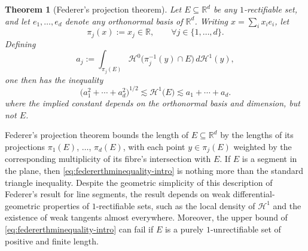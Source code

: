 \documentclass[12pt]{amsart}
\newtheorem{theorem}{Theorem}[section]
\theoremstyle{definition}
\numberwithin{equation}{section}
\begin{document}
\begin{theorem}[Federer's projection theorem]\label{thm:federerprojection-intro}
Let $E \subseteq \mathbb{R}^d$ be any $1$-rectifiable set, and let $e_1,\ldots,e_d$ denote any orthonormal basis of $\mathbb{R}^d$. Writing $x = \sum_i x_i e_i$, let
$$
\pi_j(x) := x_j \in \mathbb{R}, \qquad \forall j \in \{1,\ldots,d\}.
$$
Defining
$$
a_j := \int_{\pi_j(E)} \mathcal{H}^0\big(\pi_j^{-1}(y) \cap E\big)\,d\mathcal{H}^1(y),
$$
one then has the inequality
\begin{equation}\label{eq:federerthminequality-intro}
\big(a_1^2 + \cdots + a_d^2 \big)^{1/2} \lesssim \mathcal{H}^1\big(E \big) \lesssim a_1 + \cdots + a_d.
\end{equation}
where the implied constant depends on the orthonormal basis and dimension, but not $E$.
\end{theorem}

Federer's projection theorem bounds the length of $E \subseteq \mathbb{R}^d$ by the lengths of its projections $\pi_1(E)$, $\ldots$, $\pi_d(E)$, with each point $y \in \pi_j(E)$ weighted by the corresponding multiplicity of its fibre's intersection with $E$. If $E$ is a segment in the plane, then \eqref{eq:federerthminequality-intro} is nothing more than the standard triangle inequality. Despite the geometric simplicity of this description of Federer's result for line segments, the result depends on weak differential-geometric properties of $1$-rectifiable sets, such as the local density of $\mathcal{H}^1$ and the existence of weak tangents almost everywhere. Moreover, the upper bound of \eqref{eq:federerthminequality-intro} can fail if $E$ is a purely $1$-unrectifiable set of positive and finite length.
\end{document}

